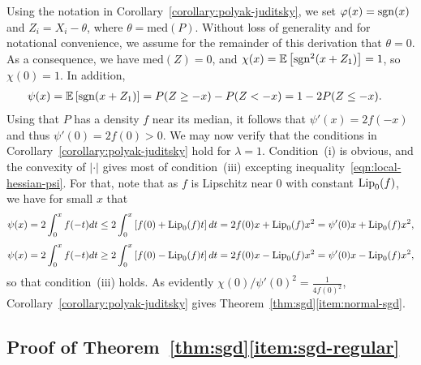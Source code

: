 Using the notation in Corollary~\ref{corollary:polyak-juditsky}, we set
$\varphi(x) = \mathrm{sgn}(x)$ and $Z_i = X_i - \theta$, where $\theta =
\mbox{med}(P)$. Without loss of generality and for notational convenience,
we assume for the remainder of this derivation that $\theta = 0$.
As a consequence, we have $\mbox{med}(Z) = 0$,
and $\chi(x) = \mathbb{E}\left[  \mathrm{sgn}^2(x+Z_1) \right]= 1$, so
$\chi(0) = 1$. In addition,
\begin{align*}
  \psi(x) & = \mathbb{E}\left[  \mathrm{sgn}(x+ Z_1) \right] =
  P(Z \ge -x) - P(Z < -x) = 1 - 2 P(Z \le -x).
\end{align*}
Using that $P$ has a density $f$ near its median, it follows that $\psi'(x)
= 2f(-x)$ and thus $\psi'(0) = 2f(0) > 0$.  We may now verify that the
conditions in Corollary~\ref{corollary:polyak-juditsky} hold for $\lambda =
1$. Condition~(i) is obvious, and the convexity of $|\cdot|$ gives most of
condition~(iii) excepting inequality~\eqref{eqn:local-hessian-psi}. For
that, note that as $f$ is Lipschitz near 0 with constant ${\rm \textup{Lip}}_0(f)$, we
have for small $x$ that
\begin{equation*}
  \psi(x) = 2 \int_0^x f(-t) dt
  \leq 2 \int_0^x \left[f(0) + {\rm \textup{Lip}}_0(f) t \right] dt
  = 2 f(0) x + {\rm \textup{Lip}}_0(f) x^2
  = \psi'(0) x + {\rm \textup{Lip}}_0(f) x^2,
\end{equation*}
\begin{equation*}
  \psi(x) = 2 \int_0^x f(-t) dt
  \geq 2 \int_0^x \left[f(0) - {\rm \textup{Lip}}_0(f) t \right] dt
  = 2 f(0) x - {\rm \textup{Lip}}_0(f) x^2
  = \psi'(0) x - {\rm \textup{Lip}}_0(f) x^2,
\end{equation*}
so that condition~(iii) holds.
As evidently $\chi(0) / \psi'(0)^2 = \frac{1}{4 f(0)^2}$,
Corollary~\ref{corollary:polyak-juditsky} gives
Theorem~\ref{thm:sgd}\eqref{item:normal-sgd}.

\subsection{Proof of Theorem~\ref{thm:sgd}\eqref{item:sgd-regular}}
\label{sec:proof-sgd-regular}

